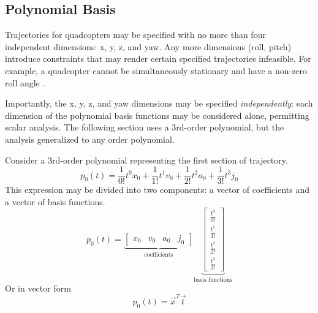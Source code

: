 \documentclass[12pt]{article}
\begin{document}
\subsection{Polynomial Basis}
Trajectories for quadcopters may be specified with no more than four independent
dimensions: x, y, z, and yaw. Any more dimensions (roll, pitch) introduce
constraints that may render certain specified trajectories infeasible. For
example, a quadcopter cannot be simultaneously stationary and have a non-zero
roll angle \cite{mellinger2011minimum}.

Importantly, the x, y, z, and yaw dimensions may be specified
\textit{independently}: each dimension of the polynomial basis functions may be
considered alone, permitting scalar analysis. The following section uses a
3rd-order polynomial, but the analysis generalized to any order polynomial.

Consider a 3rd-order polynomial representing the first section of trajectory.
\begin{equation*}
  p_{0}(t) = \frac{1}{0!}t^{0}x_{0} + \frac{1}{1!}t^{1}v_{0}
           + \frac{1}{2!}t^{2}a_{0} + \frac{1}{3!}t^{3}j_{0}
\end{equation*}
%
This expression may be divided into two components: a vector of coefficients and
a vector of basis functions.
\begin{equation*}
  p_{0}(t) = 
  \underbrace{
  \begin{bmatrix}
    x_{0} & v_{0} & a_{0} & j_{0}
  \end{bmatrix}
  }_{\text{coefficients}}
  \underbrace{
  \begin{bmatrix}
    \frac{t^{0}}{0!} \\[6pt]
    \frac{t^{1}}{1!} \\[6pt]
    \frac{t^{2}}{2!} \\[6pt]
    \frac{t^{3}}{3!}
  \end{bmatrix}
  }_{\text{basis functions}}
\end{equation*}
%
Or in vector form
\begin{equation*}
  p_{0}(t) = \vec{x}^{T} \vec{t}
\end{equation*}
\end{document}
